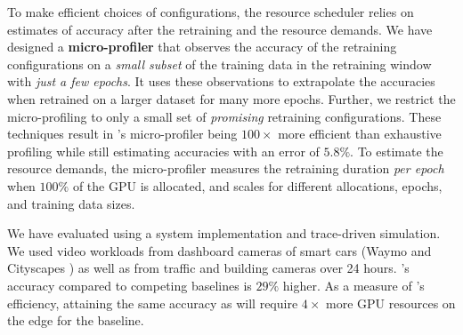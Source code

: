 To make efficient choices of configurations, the resource scheduler relies on estimates of accuracy after the retraining and the resource demands. We have designed a {\bf micro-profiler} that observes the accuracy of the retraining configurations on a {\em small subset} of the training data in the retraining window with {\em just a few epochs}. It uses these observations to extrapolate the accuracies when retrained on a larger dataset for many more epochs. Further, we restrict the micro-profiling to only a small set of {\em promising} retraining configurations. These techniques result in {\name}'s micro-profiler being $100\times$ more efficient than exhaustive profiling while still estimating accuracies with an error of $5.8\%$. To estimate the resource demands, the micro-profiler measures the retraining duration {\em per epoch} when $100\%$ of the GPU is allocated, and scales %
for different allocations, epochs, and training data sizes. 

 We have evaluated {\name} using a system implementation and trace-driven simulation. We used video workloads from dashboard cameras of smart cars (Waymo \cite{waymo} and Cityscapes \cite{cityscapes}) as well as from traffic and building cameras over 24 hours. 
{\name}'s accuracy compared to competing baselines is $29\%$ higher. As a measure of {\name}'s efficiency, attaining the same accuracy as {\name} will require $4\times$ more GPU resources on the edge for the baseline. 

